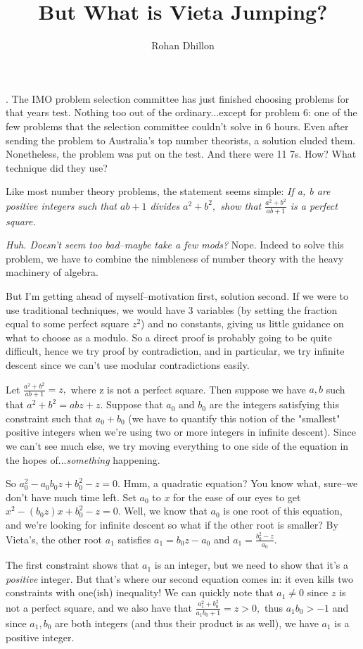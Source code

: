 \documentclass{article}
\title{But What is Vieta Jumping?}
\author{Rohan Dhillon}
\begin{document}
. The IMO problem selection committee has just finished choosing problems for that years test. Nothing too out of the ordinary...except for problem 6: one of the few problems that the selection committee couldn't solve in 6 hours. Even after sending the problem to Australia's top number theorists, a solution eluded them. Nonetheless, the problem was put on the test. And there were 11 7s. How? What technique did they use?

Like most number theory problems, the statement seems simple: \textit{If a, b are positive integers such that $ab+1 $ divides $a^2+b^2,$ show that $\frac{a^2+b^2}{ab+1}$ is a perfect square.} 

\textit{Huh. Doesn't seem too bad--maybe take a few mods?} Nope. Indeed to solve this problem, we have to combine the nimbleness of number theory with the heavy machinery of algebra. 

But I'm getting ahead of myself--motivation first, solution second. If we were to use traditional techniques, we would have 3 variables (by setting the fraction equal to some perfect square $z^2$) and no constants, giving us little guidance on what to choose as a modulo. So a direct proof is probably going to be quite difficult, hence we try proof by contradiction, and in particular, we try infinite descent since we can't use modular contradictions easily.

Let $\frac{a^2+b^2}{ab+1}=z,$ where z is not a perfect square. Then suppose we have $a,b$ such that $a^2+b^2=abz+z.$ Suppose that $a_0$ and $b_0$ are the integers satisfying this constraint such that $a_0+b_0$ (we have to quantify this notion of the "smallest" positive integers when we're using two or more integers in infinite descent). Since we can't see much else, we try moving everything to one side of the equation in the hopes of...\textit{something} happening.

So $a_0^2-a_0b_0z+b_0^2-z=0.$ Hmm, a quadratic equation? You know what, sure--we don't have much time left. Set $a_0$ to $x$ for the ease of our eyes to get $x^2-(b_0z)x+b_0^2-z=0.$ Well, we know that $a_0$ is one root of this equation, and we're looking for infinite descent so what if the other root is smaller? By Vieta's, the other root $a_1$ satisfies $a_1=b_0z-a_0$ and $a_1=\frac{b_0^2-z}{a_0}.$

The first constraint shows that $a_1$ is an integer, but we need to show that it's a \textit{positive} integer. But that's where our second equation comes in: it even kills two constraints with one(ish) inequality! We can quickly note that $a_1 \ne 0$ since $z$ is not a perfect square, and we also have that $\frac{a_1^2+b_0^2}{a_1b_0+1}=z > 0,$ thus $a_1b_0 > -1$ and since $a_1, b_0$ are both integers (and thus their product is as well), we have $a_1$ is a positive integer. 
\end{document}
